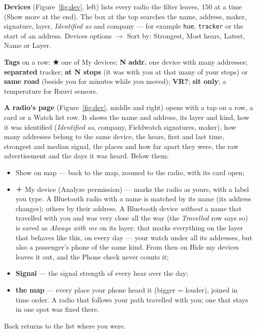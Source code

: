 \documentclass[10pt,a4paper]{article}
\newcommand{\ui}[1]{\textsf{\small #1}}            %
\newcommand{\lead}[1]{\textbf{#1}\enspace}           %
\begin{document}
\lead{Devices} (Figure~\ref{fig:dev}, left) lists every radio the filter leaves, 150 at a time (\ui{Show more} at the end). The box at the top searches the name, address, maker, signature, layer, \emph{Identified as} and company --- for example \texttt{hue}, \texttt{tracker} or the start of an address. \ui{Devices options} $\rightarrow$ \ui{Sort by}: \ui{Strongest}, \ui{Most hears}, \ui{Latest}, \ui{Name} or \ui{Layer}.

\lead{Tags} on a row: \textbf{★} one of My devices; \textbf{N addr.} one device with many addresses; \textbf{separated} tracker; \textbf{at N stops} (it was with you at that many of your stops) or \textbf{same road} (beside you for minutes while you moved); \textbf{VR?}; \textbf{sit only}; a temperature for Ruuvi sensors.

\lead{A radio's page} (Figure~\ref{fig:dev}, middle and right) opens with a tap on a row, a card or a Watch list row. It shows the name and address, its layer and kind, how it was identified (\emph{Identified as}, company, Fieldwatch signatures, maker), how many addresses belong to the same device, the hears, first and last time, strongest and median signal, the places and how far apart they were, the raw advertisement and the days it was heard. Below them:
\begin{itemize}[leftmargin=1.2em]
\item \ui{Show on map} --- back to the map, zoomed to the radio, with its card open;
\item \ui{＋ My device} (Analyze permission) --- marks the radio as yours, with a label you type. A Bluetooth radio with a name is matched by its name (its address changes); others by their address. A Bluetooth device \emph{without} a name that travelled with you and was very close all the way (the \emph{Travelled} row says so) is saved as \emph{Always with me} on its layer: that marks everything on the layer that behaves like this, on every day --- your watch under all its addresses, but also a passenger's phone of the same kind. From then on \ui{Hide my devices} leaves it out, and the Phone check never counts it;
\item \textbf{Signal} --- the signal strength of every hear over the day;
\item \textbf{the map} --- every place your phone heard it (bigger = louder), joined in time order. A radio that follows your path travelled with you; one that stays in one spot was fixed there.
\end{itemize}
Back returns to the list where you were.
\end{document}
